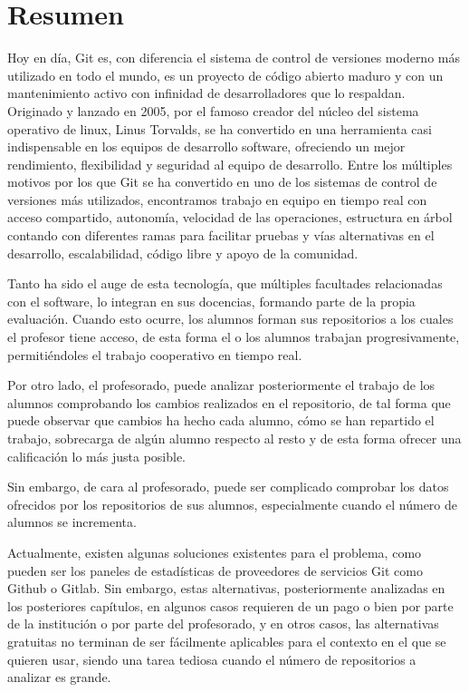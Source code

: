 \chapter*{Resumen\label{00summary}}


Hoy en día, Git\cite{EDteam,CodicesSoftware,Uqbar,Sivsa} es, con diferencia el sistema de control de versiones
moderno más utilizado en todo el mundo, es un proyecto de código
abierto maduro y con un mantenimiento activo con infinidad de
desarrolladores que lo respaldan. Originado y lanzado en 2005, por el
famoso creador del núcleo del sistema operativo de linux, Linus
Torvalds, se ha convertido en una herramienta casi indispensable en
los equipos de desarrollo software, ofreciendo un mejor rendimiento,
flexibilidad y seguridad al equipo de desarrollo. Entre los múltiples
motivos por los que Git se ha convertido en uno de los sistemas de
control de versiones más utilizados, encontramos trabajo en equipo en
tiempo real con acceso compartido, autonomía, velocidad de las
operaciones, estructura en árbol contando con diferentes ramas para
facilitar pruebas y vías alternativas en el desarrollo, escalabilidad,
código libre y apoyo de la comunidad.

Tanto ha sido el auge de esta tecnología, que múltiples facultades
relacionadas con el software, lo integran en sus docencias, formando
parte de la propia evaluación. Cuando esto ocurre, los alumnos forman
sus repositorios a los cuales el profesor tiene acceso, de esta forma
el o los alumnos trabajan progresivamente, permitiéndoles el trabajo
cooperativo en tiempo real.

Por otro lado, el profesorado, puede analizar posteriormente el
trabajo de los alumnos comprobando los cambios realizados en el
repositorio, de tal forma que puede observar que cambios ha hecho cada
alumno, cómo se han repartido el trabajo, sobrecarga de algún alumno
respecto al resto y de esta forma ofrecer una calificación lo más
justa posible.

Sin embargo, de cara al profesorado, puede ser complicado comprobar
los datos ofrecidos por los repositorios de sus alumnos, especialmente
cuando el número de alumnos se incrementa.

Actualmente, existen algunas soluciones existentes para el problema,
como pueden ser los paneles de estadísticas de proveedores de
servicios Git como Github o Gitlab. Sin embargo, estas alternativas,
posteriormente analizadas en los posteriores capítulos, en algunos
casos requieren de un pago o bien por parte de la institución o por
parte del profesorado, y en otros casos, las alternativas gratuitas no
terminan de ser fácilmente aplicables para el contexto en el que se
quieren usar, siendo una tarea tediosa cuando el número de
repositorios a analizar es grande.

